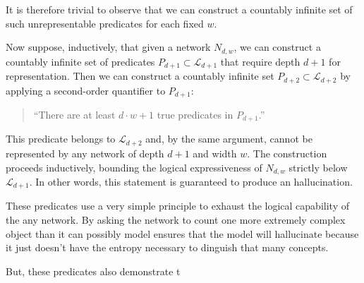 \documentclass[12pt]{article}
\theoremstyle{plain}
\begin{document}
It is therefore trivial to observe that we can construct a countably infinite set of such unrepresentable predicates for each fixed $w$.

Now suppose, inductively, that given a network $N_{d,w}$, we can construct a countably infinite set of predicates $P_{d+1} \subset \mathcal{L}_{d+1}$ that require depth $d+1$ for representation. Then we can construct a countably infinite set $P_{d+2} \subset \mathcal{L}_{d+2}$ by applying a second-order quantifier to $P_{d+1}$:

\begin{quote}
“There are at least $d \cdot w + 1$ true predicates in $P_{d+1}$.”
\end{quote}

This predicate belongs to $\mathcal{L}_{d+2}$ and, by the same argument, cannot be represented by any network of depth $d+1$ and width $w$. The construction proceeds inductively, bounding the logical expressiveness of $N_{d,w}$ strictly below $\mathcal{L}_{d+1}$. In other words, this statement is guaranteed to produce an hallucination.

These predicates use a very simple principle to exhaust the logical capability of the any network.  By asking the network to count one more extremely complex object than it can possibly model ensures that the model will hallucinate because it just doesn't have the entropy necessary to dinguish that many concepts.

But, these predicates also demonstrate t
\end{document}
